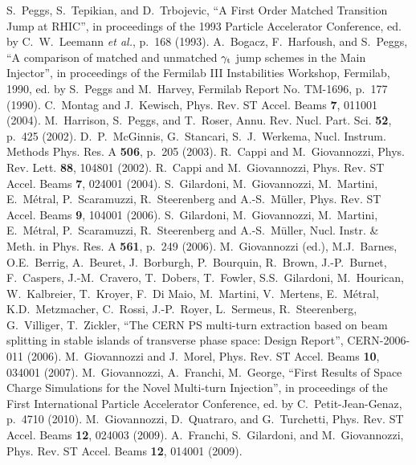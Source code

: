 \documentclass{article}
\begin{document}
\begin{thebibliography}{99}
%
 S.~Peggs, S.~Tepikian, and D.~Trbojevic, ``A First Order Matched Transition Jump at RHIC'', in proceedings of the 1993 Particle Accelerator Conference, ed. by C.~W.~Leemann {\sl et al.}, p.~168 (1993).
%
 A.~Bogacz, F.~Harfoush, and S.~Peggs, ``A comparison of matched and unmatched $\gamma_{\rm t}$ jump schemes in the Main Injector'', in proceedings of the Fermilab III Instabilities Workshop, Fermilab, 1990, ed. by S.~Peggs and M.~Harvey, Fermilab Report No. TM-1696, p.~177 (1990).
%
 C.~Montag and J.~Kewisch, Phys. Rev. ST Accel. Beams {\bf 7}, 011001 (2004).
%
 M.~Harrison, S.~Peggs, and T.~Roser, Annu. Rev. Nucl. Part. Sci. {\bf 52}, p.~425 (2002).
%
 D.~P.~McGinnis, G.~Stancari, S.~J.~Werkema, 
Nucl. Instrum. Methods Phys. Res. A {\bf 506}, p.~205 (2003).
%
 R.~Cappi and M.~Giovannozzi, Phys. Rev. Lett. {\bf 88}, 104801 (2002). 
%
 R.~Cappi and M.~Giovannozzi, Phys. Rev. ST Accel. Beams {\bf 7}, 024001 (2004).
%
 S.~Gilardoni, M.~Giovannozzi, M.~Martini, E.~M{\'e}tral, P.~Scaramuzzi, R.~Steerenberg and A.-S.~M\"{u}ller, Phys. Rev. ST Accel. Beams {\bf 9}, 104001 (2006). 
%
 S.~Gilardoni, M.~Giovannozzi, M.~Martini, E.~M{\'e}tral, P.~Scaramuzzi, R.~Steerenberg and A.-S.~M\"{u}ller, Nucl. Instr. \& Meth. in Phys. Res. A {\bf 561}, p.~249 (2006).
%
 M.~Giovannozzi (ed.), M.J.~Barnes, O.E.~Berrig, A.~Beuret, J.~Borburgh, P.~Bourquin, R.~Brown, J.-P.~Burnet, F.~Caspers, J.-M.~Cravero, T.~Dobers, T.~Fowler, S.S.~Gilardoni, M.~Hourican, W.~Kalbreier, T.~Kroyer, F.~Di Maio, M.~Martini, V.~Mertens, E.~M\'etral, K.D.~Metzmacher, C.~Rossi, J.-P.~Royer, L.~Sermeus, R.~Steerenberg, G.~Villiger, T.~Zickler, ``The CERN PS multi-turn extraction based on beam splitting in stable islands of transverse phase space: Design Report'', CERN-2006-011 (2006). 
%
 M.~Giovannozzi and J.~Morel, Phys. Rev. ST Accel. Beams {\bf 10}, 034001 (2007).
%
 M.~Giovannozzi, A.~Franchi, M.~George, ``First Results of Space Charge Simulations for the Novel Multi-turn Injection'', in proceedings of the First International Particle Accelerator Conference, ed. by C.~Petit-Jean-Genaz, p.~4710 (2010).
%
 M.~Giovannozzi, D.~Quatraro, and G.~Turchetti, Phys. Rev. ST Accel. Beams {\bf 12}, 024003 (2009).
%
 A.~Franchi, S.~Gilardoni, and M.~Giovannozzi, 
Phys. Rev. ST Accel. Beams {\bf 12}, 014001 (2009). 

\end{thebibliography}
\end{document}
